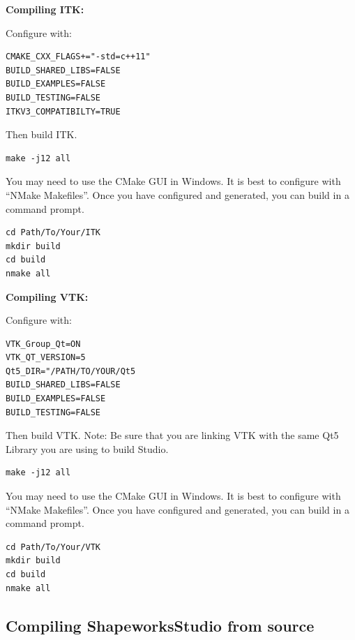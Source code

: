 \documentclass[letterpaper,12pt]{article}   %
\begin{document}
\vspace{0.6in}
\noindent\textbf{Compiling ITK:} 

Configure with:
\begin{lstlisting}[style=BashInputStyle]
CMAKE_CXX_FLAGS+="-std=c++11"
BUILD_SHARED_LIBS=FALSE
BUILD_EXAMPLES=FALSE
BUILD_TESTING=FALSE
ITKV3_COMPATIBILTY=TRUE
\end{lstlisting}

Then build ITK.

\begin{lstlisting}[style=BashInputStyle]
make -j12 all
\end{lstlisting}

You may need to use the CMake GUI in Windows. It is best to configure with “NMake Makefiles”. Once you have configured and generated, you can build in a command prompt.

\begin{lstlisting}[style=BashInputStyle]
cd Path/To/Your/ITK
mkdir build
cd build
nmake all
\end{lstlisting}

\vspace{0.1in}
\noindent\textbf{Compiling VTK:}

Configure with:

\begin{lstlisting}[style=BashInputStyle]
VTK_Group_Qt=ON
VTK_QT_VERSION=5
Qt5_DIR="/PATH/TO/YOUR/Qt5
BUILD_SHARED_LIBS=FALSE
BUILD_EXAMPLES=FALSE
BUILD_TESTING=FALSE
\end{lstlisting}

Then build VTK. Note: Be sure that you are linking VTK with the same Qt5 Library you are using to build Studio.

\begin{lstlisting}[style=BashInputStyle]
make -j12 all
\end{lstlisting}

You may need to use the CMake GUI in Windows. It is best to configure with “NMake Makefiles”. Once you have configured and generated, you can build in a command prompt.

\begin{lstlisting}[style=BashInputStyle]
cd Path/To/Your/VTK
mkdir build
cd build
nmake all
\end{lstlisting}

\subsection{Compiling ShapeworksStudio from source}
\end{document}
